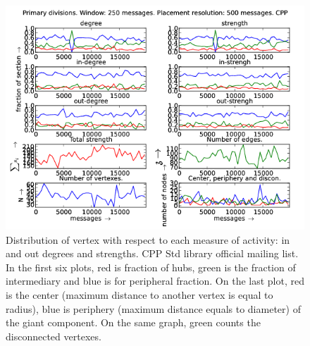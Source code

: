 \documentclass[%
 aip,
 jmp,%
 amsmath,amssymb,
 reprint,%
]{revtex4-1}
\begin{document}
\begin{figure}[hbtp] 
   \centering
        \includegraphics[width=\textwidth]{figs/CPP/250}
    \caption{Distribution of vertex with respect to each measure of activity: in and out degrees and strengths. CPP Std library official mailing list. In the first six plots, red is fraction of hubs, green is the fraction of intermediary and blue is for peripheral fraction. On the last plot, red is the center (maximum distance to another vertex is equal to radius), blue is periphery (maximum distance equals to diameter) of the giant component. On the same graph, green counts the disconnected vertexes.}
    \label{fig:cpp250}
\end{figure}
\end{document}
